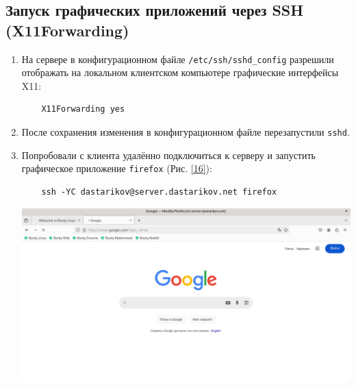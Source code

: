 \subsection{Запуск графических приложений через SSH (X11Forwarding)}
\begin{enumerate}
\item На сервере в конфигурационном файле \texttt{/etc/ssh/sshd\_config} разрешили отображать на локальном клиентском компьютере графические интерфейсы X11:
  \begin{verbatim}
    X11Forwarding yes
  \end{verbatim}
\item После сохранения изменения в конфигурационном файле перезапустили \texttt{sshd}.

\item Попробовали с клиента удалённо подключиться к серверу и запустить графическое приложение \texttt{firefox} (Рис. \ref{16}):
  \begin{verbatim}
    ssh -YC dastarikov@server.dastarikov.net firefox
  \end{verbatim}
\begin{center}
  \centering
  \includegraphics[width=\textwidth]{../images/image16.png}
  \label{16}
\end{center}

\end{enumerate}

